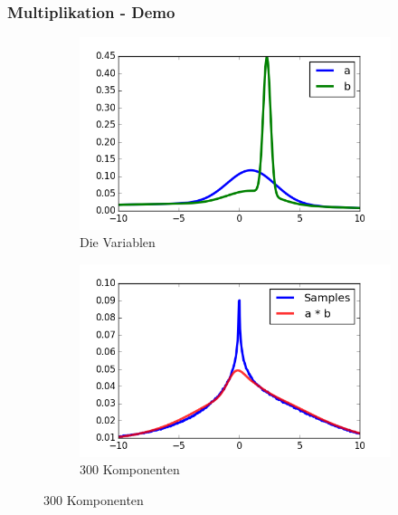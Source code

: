 \documentclass[11pt]{beamer}
\begin{document}
\begin{frame}
  \frametitle{Multiplikation - Demo}

  \begin{figure}
    \centering
    \begin{subfigure}[t]{0.45\textwidth}
      \centering
      \includegraphics[width=\textwidth]{thesis/operations/product-hermite-vars}
      \caption{Die Variablen}
    \end{subfigure}
    \hfill
    \begin{subfigure}[t]{0.45\textwidth}
      \centering
      \includegraphics[width=\textwidth]{thesis/operations/product-hermite-50-components}
      \caption{$300$ Komponenten}
    \end{subfigure}
  \end{figure}
  \begin{figure}
    \centering
    \begin{subfigure}[t]{0.45\textwidth}
      \centering

\end{subfigure}
\end{figure}
\end{frame}
\end{document}

